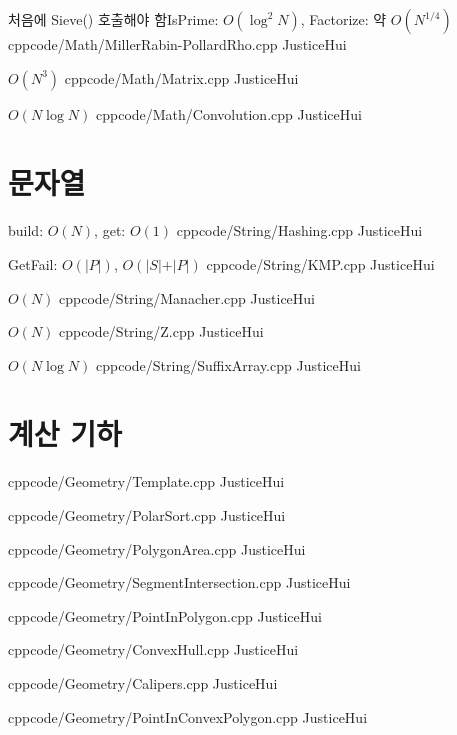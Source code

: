 \documentclass[landscape, 8pt, a4paper, twocolumn]{extarticle} %
\begin{document}
{처음에 Sieve() 호출해야 함}{IsPrime: $O(\log^2 N)$, Factorize: 약 $O(N^{1/4})$}
{cpp}{code/Math/MillerRabin-PollardRho.cpp}
{JusticeHui}

{}{$O(N^3)$}
{cpp}{code/Math/Matrix.cpp}
{JusticeHui}

{}{$O(N \log N)$}
{cpp}{code/Math/Convolution.cpp}
{JusticeHui}

\section{문자열}

{}{build: $O(N)$, get: $O(1)$}
{cpp}{code/String/Hashing.cpp}
{JusticeHui}

{}{GetFail: $O(\vert P\vert)$, $O(\vert S\vert + \vert P\vert)$}
{cpp}{code/String/KMP.cpp}
{JusticeHui}

{}{$O(N)$}
{cpp}{code/String/Manacher.cpp}
{JusticeHui}

{}{$O(N)$}
{cpp}{code/String/Z.cpp}
{JusticeHui}

{}{$O(N \log N)$}
{cpp}{code/String/SuffixArray.cpp}
{JusticeHui}

\section{계산 기하}

{}{}
{cpp}{code/Geometry/Template.cpp}
{JusticeHui}

{}{}
{cpp}{code/Geometry/PolarSort.cpp}
{JusticeHui}

{}{}
{cpp}{code/Geometry/PolygonArea.cpp}
{JusticeHui}

{}{}
{cpp}{code/Geometry/SegmentIntersection.cpp}
{JusticeHui}

{}{}
{cpp}{code/Geometry/PointInPolygon.cpp}
{JusticeHui}

{}{}
{cpp}{code/Geometry/ConvexHull.cpp}
{JusticeHui}

{}{}
{cpp}{code/Geometry/Calipers.cpp}
{JusticeHui}

{}{}
{cpp}{code/Geometry/PointInConvexPolygon.cpp}
{JusticeHui}
\end{document}
